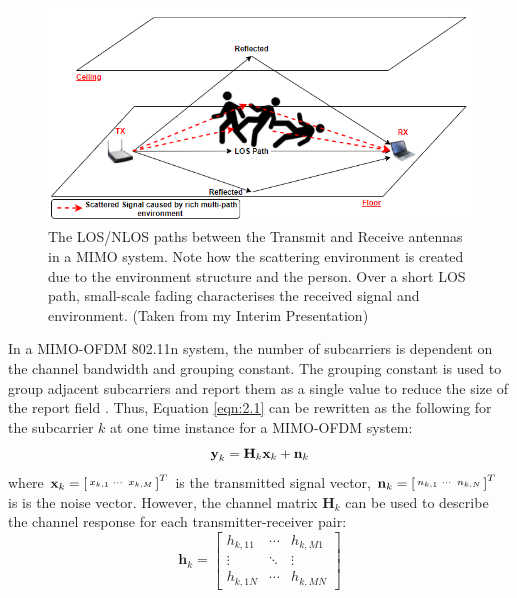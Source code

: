 \begin{figure}[H]
    \centering
    \includegraphics[scale=0.7]{Figures/tempInterim.PNG}
    \caption{The LOS/NLOS paths between the Transmit and Receive antennas in a MIMO system. Note how the scattering environment is created due to the environment structure and the person. Over a short LOS path, small-scale fading characterises the received signal and environment. (Taken from my Interim Presentation)}
    \label{fig:LOS_NLOS}
\end{figure}
In a MIMO-OFDM 802.11n system, the number of subcarriers is dependent on the channel bandwidth and grouping constant. The grouping constant is used to group adjacent subcarriers and report them as a single value to reduce the size of the report field \citep{full802.11nStandard}. Thus, Equation \ref{eqn:2.1} can be rewritten as the following for the subcarrier $k$ at one time instance for a MIMO-OFDM system:
\vspace{-11pt}
\begin{equation}\label{eqn:2.2}
    \textbf{y}_k = \textbf{H}_k\textbf{x}_k+\textbf{n}_k
    \vspace{-11pt}
\end{equation}
where $\textbf{x}_k = \begin{bsmallmatrix}x_{k,1} & \cdots & x_{k,M}\end{bsmallmatrix}^T$ is the transmitted signal vector, $\textbf{n}_k = \begin{bsmallmatrix}n_{k,1} & \cdots & n_{k,N}\end{bsmallmatrix}^T$ is is the noise vector. However, the channel matrix $\textbf{H}_{k}$ can be used to describe the channel response for each transmitter-receiver pair: 
\vspace{-6.5pt}
\begin{equation}\label{eqn:2.3}
\textbf{h}_{k}=\left[
\begin{array}{ccc}
    h_{k,11} & \cdots & h_{k,M1} \\
   \vdots & \ddots & \vdots \\
    h_{k,1N} & \cdots & h_{k,MN}
\end{array}
\right]
\end{equation}
